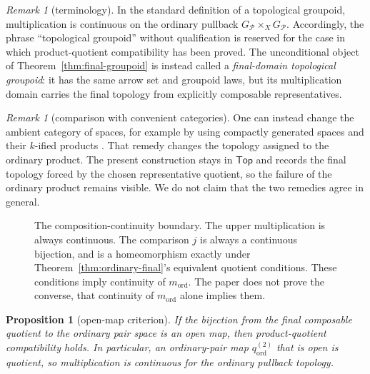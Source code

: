 \documentclass[10pt,reqno]{amsart}
\theoremstyle{definition}
\theoremstyle{plain}
\newtheorem{proposition}[definition]{Proposition}
\theoremstyle{remark}
\newtheorem{remark}[definition]{Remark}
\newcommand{\Fin}{\mathrm{fin}}
\newcommand{\Ord}{\mathrm{ord}}
\newcommand{\Top}{\mathsf{Top}}
\begin{document}
\begin{remark}[terminology]
In the standard definition of a topological groupoid, multiplication is
continuous on the ordinary pullback $G_{\mathcal P}\times_XG_{\mathcal P}$.
Accordingly, the phrase ``topological groupoid'' without qualification is
 reserved for the case in which product-quotient compatibility has been
 proved.  The unconditional object of Theorem~\ref{thm:final-groupoid} is instead called a
\emph{final-domain topological groupoid}: it has the same arrow set and
groupoid laws, but its multiplication domain carries the final topology from
explicitly composable representatives.
\end{remark}

\begin{remark}[comparison with convenient categories]
One can instead change the ambient category of spaces, for example by using
compactly generated spaces and their $k$-ified products \cite{May99}.  That
remedy changes the topology assigned to the ordinary product.  The present
construction stays in $\Top$ and records the final topology forced by the
chosen representative quotient, so the failure of the ordinary product
remains visible.  We do not claim that the two remedies agree in general.
\end{remark}



\begin{figure}[htbp]
\centering
{}
\caption{The composition-continuity boundary.
The upper multiplication is always continuous.  The comparison $j$ is
always a continuous bijection, and is a homeomorphism exactly under
Theorem~\ref{thm:ordinary-final}'s equivalent quotient conditions.
These conditions imply continuity of $m_{\Ord}$.  The paper does not prove
the converse, that continuity of $m_{\Ord}$ alone implies them.}
\label{fig:final-ordinary}
\end{figure}
\FloatBarrier

\begin{proposition}[open-map criterion]
If the bijection from the final composable quotient to the ordinary pair space
is an open map, then product-quotient compatibility holds.  In particular, an
ordinary-pair map $q_{\Ord}^{(2)}$ that is open is quotient, so multiplication
is continuous for the ordinary pullback topology.
\end{proposition}
\end{document}
